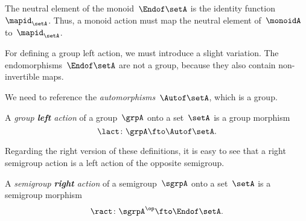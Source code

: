 The neutral element of the monoid~$\Endof\setA$ is the identity function~$\mapid_{\setA}$.
Thus, a monoid action must map the neutral element of~$\monoidA$ to~$\mapid_{\setA}$.
%


For defining a group left action, we must introduce a slight variation.
The endomorphisms~$\Endof\setA$ are not a group, because they also contain non-invertible maps.

We need to reference the \emph{automorphisms}~$\Autof\setA$, which is a group.

\begin{ctdefinition}\label{def:group-left-action}
  A \emph{group \textbf{left} action} of a group~$\grpA$ onto a set~$\setA$ is a group morphism
  \begin{equation}\label{eq:act-group}
    \lact \colon \grpA \fto \Autof\setA.
  \end{equation}
\end{ctdefinition}


Regarding the right version of these definitions, it is easy to see that a right semigroup action is a left action of the opposite semigroup.


\begin{ctdefinition}\label{def:semigroup-right-action}
  A \emph{semigroup \textbf{right} action} of a semigroup~$\sgrpA$ onto a set~$\setA$ is a semigroup morphism
  \begin{equation}
    \ract \colon \sgrpA^{\op} \fto \Endof\setA.
  \end{equation}
\end{ctdefinition}

